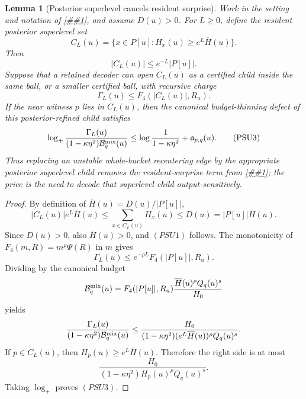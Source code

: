 \documentclass[10pt]{article}
\newcommand{\cref}[1]{\ref{##1}}
\newtheorem{lemma}[theorem]{Lemma}
\theoremstyle{definition}
\begin{document}
\begin{lemma}[Posterior superlevel cancels resident surprise]
   \label{lem:posterior-superlevel-cancels-surprise}
   Work in the setting and notation of
   \cref{lem:canonical-defect-splitting}, and assume \(D(u)>0\).  For
   \(L\ge0\), define the resident posterior superlevel set
   \[
      C_L(u)
      =
      \{x\in P[u]:H_x(u)\ge e^L\overline H(u)\}.
      \tag{PSU0}
   \]
   Then
   \[
      |C_L(u)|\le e^{-L}|P[u]|.
      \tag{PSU1}
   \]
   Suppose that a retained decoder can open \(C_L(u)\) as a certified child
   inside the same ball, or a smaller certified ball, with recursive charge
   \[
      \Gamma_L(u)\le F_4(|C_L(u)|,R_u).
      \tag{PSU2}
   \]
   If the near witness \(p\) lies in \(C_L(u)\), then the canonical
   budget-thinning defect of this posterior-refined child satisfies
   \[
      \log_+
      \frac{\Gamma_L(u)}
           {(1-\kappa\eta^2)\mathcal B_q^{\rm mix}(u)}
      \le
      \log\frac1{1-\kappa\eta^2}
      +
      \mathfrak a_{p,q}(u).
      \tag{PSU3}
   \]
   Thus replacing an unstable whole-bucket recentering edge by the appropriate
   posterior superlevel child removes the resident-surprise term from
   \cref{lem:canonical-defect-splitting}; the price is the need to decode that
   superlevel child output-sensitively.
\end{lemma}

\begin{proof}
   By definition of \(\overline H(u)=D(u)/|P[u]|\),
   \[
      |C_L(u)|e^L\overline H(u)
      \le
      \sum_{x\in C_L(u)}H_x(u)
      \le
      D(u)
      =
      |P[u]|\overline H(u).
   \]
   Since \(D(u)>0\), also \(\overline H(u)>0\), and \((PSU1)\) follows.
   The monotonicity of \(F_4(m,R)=m^\rho\Psi(R)\) in \(m\) gives
   \[
      \Gamma_L(u)
      \le
      e^{-\rho L}F_4(|P[u]|,R_u).
   \]
   Dividing by the canonical budget
   \[
      \mathcal B_q^{\rm mix}(u)
      =
      F_4(|P[u]|,R_u)
      \frac{\overline H(u)^\rho Q_q(u)^s}{H_0}
   \]
   yields
   \[
      \frac{\Gamma_L(u)}
           {(1-\kappa\eta^2)\mathcal B_q^{\rm mix}(u)}
      \le
      \frac{H_0}
           {(1-\kappa\eta^2)(e^L\overline H(u))^\rho Q_q(u)^s}.
   \]
   If \(p\in C_L(u)\), then \(H_p(u)\ge e^L\overline H(u)\).  Therefore the
   right side is at most
   \[
      \frac{H_0}
           {(1-\kappa\eta^2)H_p(u)^\rho Q_q(u)^s}.
   \]
   Taking \(\log_+\) proves \((PSU3)\).
\end{proof}
\end{document}

